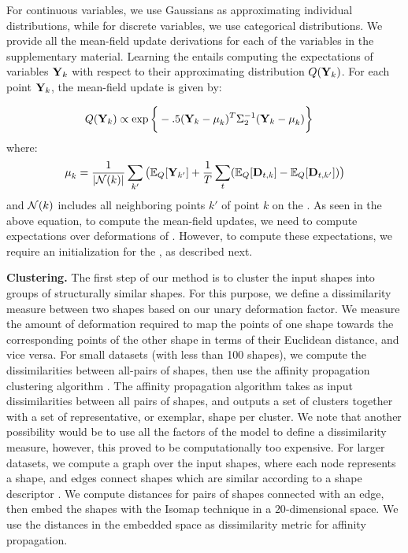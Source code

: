 For continuous variables, we use Gaussians as approximating individual distributions, while for discrete variables, we use categorical distributions. We provide all the mean-field update derivations for each of the variables in the supplementary material. Learning the  entails computing the expectations of  variables $\mathbf{Y}_k$ with respect to their approximating distribution $Q(\mathbf{Y}_k)$. For each  point $\mathbf{Y}_k$, the mean-field update is given by:

\begin{align*}
& Q(\mathbf{Y}_k) \propto \exp\bigg\{ -.5(\mathbf{Y}_k - \mbox{\relax$\mu$}_k )^T \Sigma_2^{-1} ( \mathbf{Y}_k -  \mbox{\relax$\mu$}_k )  \bigg\}
\end{align*}
where:
\begin{align*}
\mbox{\relax$\mu$}_k = \frac{1}{|\mathcal{N}(k)|} \sum\limits_{k'} \big( \mathbb{E}_Q[\mathbf{Y}_{k'}] + \frac{1}{T}\sum\limits_t(\mathbb{E}_Q[\mathbf{D}_{t,k}] - \mathbb{E}_Q[\mathbf{D}_{t,k'}]) \big)
\end{align*}
and $\mathcal{N}(k)$ includes all neighboring points $k'$ of point $k$ on the . As seen in the above equation, to compute the mean-field updates, we need to compute expectations over deformations of . However, to compute these expectations, we require an initialization for the , as described next. 

\textbf{Clustering.} The first step of our method is to cluster the input shapes into groups of structurally similar shapes. For this purpose, we define a dissimilarity measure between two shapes based on our unary deformation factor. We measure the amount of deformation required to map the points of one shape towards the corresponding points of the other shape in terms of their Euclidean distance, and vice versa. 
For small datasets (with less than 100 shapes), we compute the dissimilarities between all-pairs of shapes, then use the affinity propagation clustering algorithm \cite{Frey07}. The affinity propagation algorithm takes as input dissimilarities between all pairs of shapes, and outputs a set of clusters together with a set of representative, or exemplar, shape per cluster. We note that another possibility would be to use all the factors of the model to define a dissimilarity measure, however, this proved to be computationally too expensive. For larger datasets, we compute a graph over the input shapes, where each node represents a shape, and edges connect shapes which are similar according to a shape descriptor \cite{Kim12}. We compute distances for pairs of shapes connected with an edge, then embed the shapes with the Isomap technique \cite{Tenenbaum:2000:GGF} in a $20$-dimensional space. We use the distances in the embedded space as dissimilarity metric for affinity propagation. 

